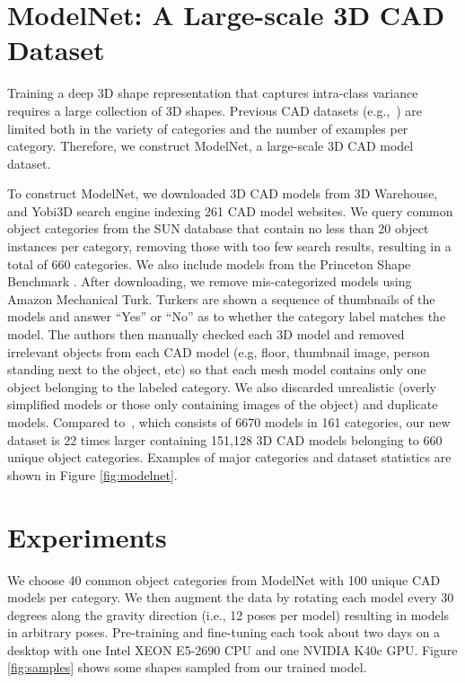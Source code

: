 \documentclass[10pt,twocolumn,letterpaper]{article}
\begin{document}
\section{ModelNet: A Large-scale 3D CAD Dataset}
Training a deep 3D shape representation that captures intra-class variance requires a large collection of 3D shapes. 
Previous CAD datasets (e.g.,~\cite{Psb}) are limited both in the variety of categories and the number of examples per category. 
Therefore, we construct ModelNet, a large-scale 3D CAD model dataset.

To construct ModelNet, we downloaded 3D CAD models from 3D Warehouse, and Yobi3D search engine indexing 261 CAD model websites. 
We query common object categories from the SUN database \cite{SUNDB}
that contain no less than 20 object instances per category, removing
those with too few search results, resulting in a total of 660 categories. We also include models from the Princeton Shape Benchmark \cite{Psb}.
After downloading, we remove mis-categorized models using Amazon
Mechanical Turk. Turkers are shown a sequence of thumbnails of the
models and answer ``Yes'' or ``No'' as to whether the category label
matches the model. The authors then manually checked each 3D model and
removed irrelevant objects from each CAD model (e.g, floor, thumbnail
image, person standing next to the object, etc) so that each mesh
model contains only one object belonging to the labeled category. We
also discarded unrealistic (overly simplified models or those only containing images of the object) and duplicate models.
Compared to~\cite{Psb}, which consists of 6670 models in 161 categories, our new dataset is 22 times larger containing 151,128 3D CAD models belonging to 660 unique object categories. Examples of major categories and dataset statistics are shown in Figure \ref{fig:modelnet}.






\section{Experiments}
We choose 40 common object categories from ModelNet with 100 unique CAD models per category. We then augment the data by rotating each model every 30 degrees along the gravity direction (i.e., 12 poses per model) resulting in models in arbitrary poses. Pre-training and fine-tuning each took about two days on a desktop with one Intel XEON E5-2690 CPU and one NVIDIA K40c GPU.
Figure \ref{fig:samples} shows some shapes sampled from our trained model.
\end{document}
